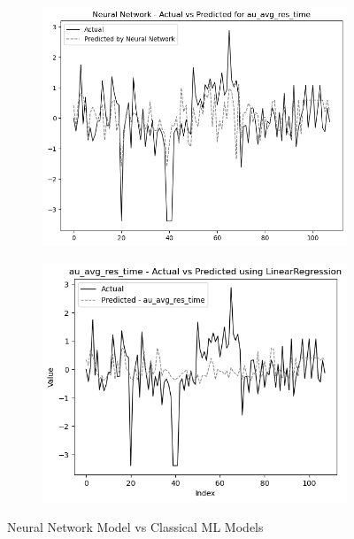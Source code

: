 \begin{figure}
    \begin{subfigure}[b]{0.49\textwidth}
        \centering
        \includegraphics[width=\textwidth]{images/nnCharts/all_data_audio_avg_response_time.png}
    \end{subfigure}\hfill
    \begin{subfigure}[b]{0.49\textwidth}
        \centering
        \includegraphics[width=\textwidth]{images/regressionCharts/all_data_audio_average_response_time.png}
    \end{subfigure}

    \caption{Neural Network Model vs Classical ML Models}
    \label{fig:nn_comparison}


\end{figure}





